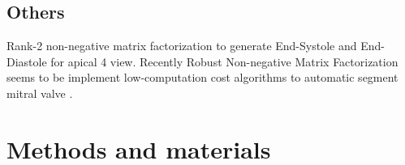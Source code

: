 \subsection{Others}
Rank-2 non-negative matrix factorization \cite{yuan2017} to generate End-Systole and End-Diastole for apical 4 view.  
Recently Robust Non-negative Matrix Factorization seems to be implement low-computation cost algorithms to automatic segment mitral valve \cite{dukler2018}.



\section{Methods and materials}
